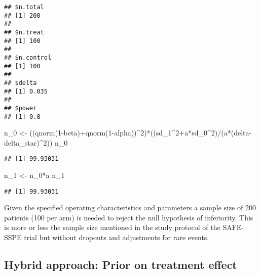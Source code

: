 \documentclass[
]{book}
\newenvironment{Shaded}{\begin{snugshade}}{\end{snugshade}}
\newcommand{\DecValTok}[1]{\textcolor[rgb]{0.00,0.00,0.81}{#1}}
\newcommand{\FunctionTok}[1]{\textcolor[rgb]{0.00,0.00,0.00}{#1}}
\newcommand{\NormalTok}[1]{#1}
\newcommand{\OtherTok}[1]{\textcolor[rgb]{0.56,0.35,0.01}{#1}}
\newcommand{\SpecialCharTok}[1]{\textcolor[rgb]{0.00,0.00,0.00}{#1}}
\begin{document}
\begin{verbatim}
## $n.total
## [1] 200
## 
## $n.treat
## [1] 100
## 
## $n.control
## [1] 100
## 
## $delta
## [1] 0.035
## 
## $power
## [1] 0.8
\end{verbatim}

\begin{Shaded}
\begin{Highlighting}[]
\NormalTok{n\_0 }\OtherTok{\textless{}{-}}\NormalTok{ ((}\FunctionTok{qnorm}\NormalTok{(}\DecValTok{1}\SpecialCharTok{{-}}\NormalTok{beta)}\SpecialCharTok{+}\FunctionTok{qnorm}\NormalTok{(}\DecValTok{1}\SpecialCharTok{{-}}\NormalTok{alpha))}\SpecialCharTok{\^{}}\DecValTok{2}\NormalTok{)}\SpecialCharTok{*}\NormalTok{((sd\_1}\SpecialCharTok{\^{}}\DecValTok{2}\SpecialCharTok{+}\NormalTok{a}\SpecialCharTok{*}\NormalTok{sd\_0}\SpecialCharTok{\^{}}\DecValTok{2}\NormalTok{)}\SpecialCharTok{/}\NormalTok{(a}\SpecialCharTok{*}\NormalTok{(delta}\SpecialCharTok{{-}}\NormalTok{delta\_star)}\SpecialCharTok{\^{}}\DecValTok{2}\NormalTok{))}
\NormalTok{n\_0}
\end{Highlighting}
\end{Shaded}

\begin{verbatim}
## [1] 99.93031
\end{verbatim}

\begin{Shaded}
\begin{Highlighting}[]
\NormalTok{n\_1 }\OtherTok{\textless{}{-}}\NormalTok{ n\_0}\SpecialCharTok{*}\NormalTok{a}
\NormalTok{n\_1}
\end{Highlighting}
\end{Shaded}

\begin{verbatim}
## [1] 99.93031
\end{verbatim}

Given the specified operating characteristics and parameters a sample size of 200 patients (100 per arm) is needed to reject the null hypothesis of inferiority. This is more or less the sample size mentioned in the study protocol of the SAFE-SSPE trial but without dropouts and adjustments for rare events.

\hypertarget{hybrid-approach-prior-on-treatment-effect}{%
\subsection{Hybrid approach: Prior on treatment effect}\label{hybrid-approach-prior-on-treatment-effect}}
\end{document}
